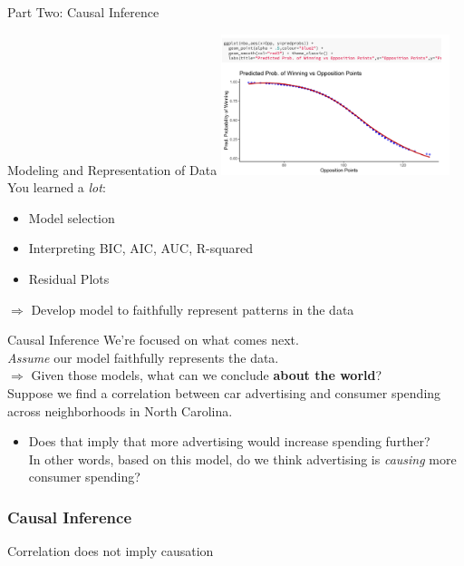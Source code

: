 \documentclass[11pt]{beamer}
\begin{document}
\begin{frame}[c]
  \centering
  Part Two: Causal Inference
\end{frame}

\begin{frame}[c]{Modeling and Representation of Data}
  \centering
       \includegraphics[width=0.5\textwidth]{logit.png} \\
       You learned a \emph{lot}:
       \begin{itemize}
          \item Model selection 
          \item Interpreting BIC, AIC, AUC, R-squared
          \item Residual Plots
       \end{itemize}
       \pause $\Rightarrow$ Develop model to \alert{faithfully represent patterns in the data}
\end{frame}


\begin{frame}[c]{Causal Inference}
  We're focused on what comes \alert{next}.\\
\pause \emph{Assume} our model faithfully represents the data. \\
\pause $\Rightarrow$ \alert{Given those models, what can we conclude \textbf{about the world}?} \\
\vspace*{0.3cm}
\pause Suppose we find a correlation between car advertising and consumer spending across neighborhoods in North Carolina.
\begin{itemize}
  \pause \item Does that imply that more advertising would increase spending further? \\
  \pause In other words, based on this model, do we think advertising is \emph{causing} more consumer spending?
\end{itemize}
\end{frame}

\begin{frame}[c]
  \frametitle{Causal Inference}
\centering
Correlation does not imply causation
\end{frame}
\end{document}
